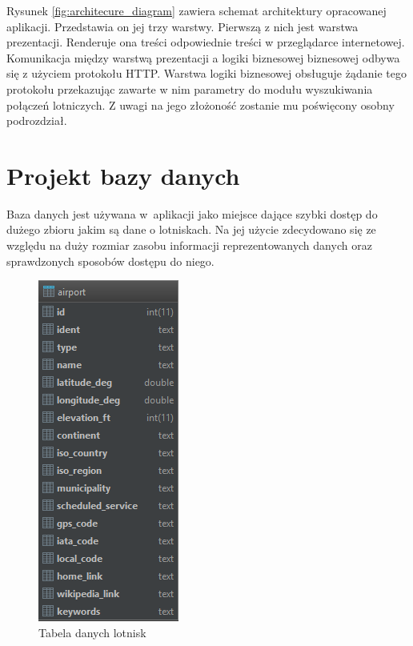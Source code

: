\documentclass[12pt, twoside]{report}
\begin{document}
\noindent Rysunek \ref{fig:architecure_diagram} zawiera schemat architektury opracowanej aplikacji. Przedstawia on jej trzy warstwy. Pierwszą z nich jest warstwa prezentacji. Renderuje ona treści odpowiednie treści w przeglądarce internetowej. Komunikacja między warstwą prezentacji a logiki biznesowej biznesowej odbywa się z użyciem protokołu HTTP. Warstwa logiki biznesowej obsługuje żądanie tego protokołu przekazując zawarte w nim parametry do modułu wyszukiwania połączeń lotniczych. Z uwagi na jego złożoność zostanie mu poświęcony osobny podrozdział.

\section{Projekt bazy danych}
Baza danych jest używana w~aplikacji jako miejsce dające szybki dostęp do dużego zbioru jakim są dane o lotniskach. Na jej użycie zdecydowano się ze względu na duży rozmiar zasobu informacji reprezentowanych danych oraz sprawdzonych sposobów dostępu do niego.

\begin{figure}[!ht]
\centering
\includegraphics[scale=1.00, keepaspectratio]{database.png}
\caption{Tabela danych lotnisk}
\label{fig:database}
\end{figure}
\end{document}
